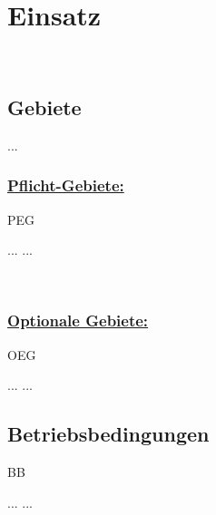 %
%


\chapter{Einsatz}
\label{ES}~\\


\section{Gebiete}
\label{ES:Gebiete}

...
\\


\subsection*{\underline{Pflicht-Gebiete:}}

\begin{ids}{\gls{PEG}}

	\id[ 1] ...
	\id[10] ...

\end{ids}

~\\

\subsection*{\underline{Optionale Gebiete:}}

\begin{ids}{\gls{OEG}}

	\id[ 11] ...
	\id[100] ...

\end{ids}


%
%
\clearpage


\section{Betriebsbedingungen}
\label{ES:BB}

\begin{ids}{\gls{BB}}

	\id[ 11] ...
	\id[100] ...

\end{ids}


